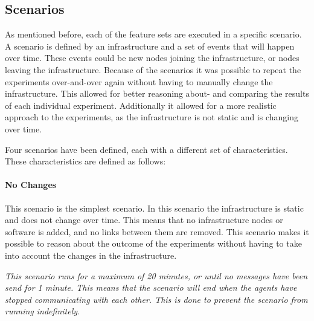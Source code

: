\subsection{Scenarios}
As mentioned before, each of the feature sets are executed in a specific scenario. A scenario is defined by an infrastructure and a set of events that will happen over time. These events could be new nodes joining the infrastructure, or nodes leaving the infrastructure. Because of the scenarios it was possible to repeat the experiments over-and-over again without having to manually change the infrastructure. This allowed for better reasoning about- and comparing the results of each individual experiment. Additionally it allowed for a more realistic approach to the experiments, as the infrastructure is not static and is changing over time.

Four scenarios have been defined, each with a different set of characteristics. These characteristics are defined as follows:


\paragraph*{No Changes}
This scenario is the simplest scenario. In this scenario the infrastructure is static and does not change over time. This means that no infrastructure nodes or software is added, and no links between them are removed. This scenario makes it possible to reason about the outcome of the experiments without having to take into account the changes in the infrastructure. 

\textit{This scenario runs for a maximum of 20 minutes, or until no messages have been send for 1 minute. This means that the scenario will end when the agents have stopped communicating with each other. This is done to prevent the scenario from running indefinitely.}

